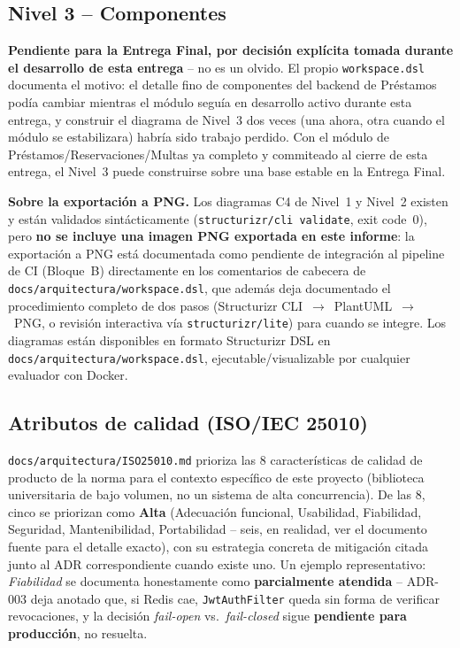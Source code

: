 \documentclass[12pt,a4paper]{article}
\begin{document}
\subsection{Nivel 3 -- Componentes}

\textbf{Pendiente para la Entrega Final, por decisión explícita tomada
durante el desarrollo de esta entrega} -- no es un olvido. El propio
\texttt{workspace.dsl} documenta el motivo: el detalle fino de
componentes del backend de Préstamos podía cambiar mientras el módulo
seguía en desarrollo activo durante esta entrega, y construir el
diagrama de Nivel~3 dos veces (una ahora, otra cuando el módulo se
estabilizara) habría sido trabajo perdido. Con el módulo de
Préstamos/Reservaciones/Multas ya completo y commiteado al cierre de
esta entrega, el Nivel~3 puede construirse sobre una base estable en la
Entrega Final.

\par\vspace{0.3cm}\noindent\colorbox{grisclaro}{\parbox{0.94\linewidth}{\vspace{0.15cm}
\textbf{Sobre la exportación a PNG.} Los diagramas C4 de Nivel~1 y
Nivel~2 existen y están validados sintácticamente
(\texttt{structurizr/cli validate}, exit code~0), pero \textbf{no se
incluye una imagen PNG exportada en este informe}: la exportación a PNG
está documentada como pendiente de integración al pipeline de CI
(Bloque~B) directamente en los comentarios de cabecera de
\texttt{docs/arquitectura/workspace.dsl}, que además deja documentado el
procedimiento completo de dos pasos (Structurizr CLI~$\to$~PlantUML~$\to$~PNG,
o revisión interactiva vía \texttt{structurizr/lite}) para cuando se
integre. Los diagramas están disponibles en formato Structurizr DSL en
\texttt{docs/arquitectura/workspace.dsl}, ejecutable/visualizable por
cualquier evaluador con Docker.
\vspace{0.15cm}}}\vspace{0.3cm}\par

\subsection{Atributos de calidad (ISO/IEC 25010)}

\texttt{docs/arquitectura/ISO25010.md} prioriza las 8 características de
calidad de producto de la norma para el contexto específico de este
proyecto (biblioteca universitaria de bajo volumen, no un sistema de alta
concurrencia). De las 8, cinco se priorizan como \textbf{Alta}
(Adecuación funcional, Usabilidad, Fiabilidad, Seguridad,
Mantenibilidad, Portabilidad -- seis, en realidad, ver el documento
fuente para el detalle exacto), con su estrategia concreta de mitigación
citada junto al ADR correspondiente cuando existe uno. Un ejemplo
representativo: \emph{Fiabilidad} se documenta honestamente como
\textbf{parcialmente atendida} -- ADR-003 deja anotado que, si Redis cae,
\texttt{JwtAuthFilter} queda sin forma de verificar revocaciones, y la
decisión \emph{fail-open} vs.\ \emph{fail-closed} sigue \textbf{pendiente
para producción}, no resuelta.
\end{document}
